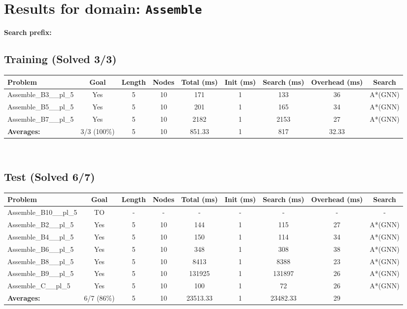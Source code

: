 \documentclass{article}
\begin{document}
\section*{Results for domain: \texttt{Assemble}}
\textbf{Search prefix:} 
\\[0.5cm]
\subsection*{Training (Solved 3/3)}
\begin{tabular}{lcccccccc}
\toprule
Problem & Goal & Length & Nodes & Total (ms) & Init (ms) & Search (ms) & Overhead (ms) & Search \\
\midrule
Assemble\_B3\_\_pl\_5 & Yes & 5 & 10 & 171 & 1 & 133 & 36 & A*(GNN) \\
Assemble\_B5\_\_pl\_5 & Yes & 5 & 10 & 201 & 1 & 165 & 34 & A*(GNN) \\
Assemble\_B7\_\_pl\_5 & Yes & 5 & 10 & 2182 & 1 & 2153 & 27 & A*(GNN) \\
\textbf{Averages:} & 3/3 (100\%) & 5 & 10 & 851.33 & 1 & 817 & 32.33 & \\
\bottomrule
\end{tabular}
\\[0.7cm]
\subsection*{Test (Solved 6/7)}
\begin{tabular}{lcccccccc}
\toprule
Problem & Goal & Length & Nodes & Total (ms) & Init (ms) & Search (ms) & Overhead (ms) & Search \\
\midrule
Assemble\_B10\_\_pl\_5 & TO & - & - & - & - & - & - & - \\
Assemble\_B2\_\_pl\_5 & Yes & 5 & 10 & 144 & 1 & 115 & 27 & A*(GNN) \\
Assemble\_B4\_\_pl\_5 & Yes & 5 & 10 & 150 & 1 & 114 & 34 & A*(GNN) \\
Assemble\_B6\_\_pl\_5 & Yes & 5 & 10 & 348 & 1 & 308 & 38 & A*(GNN) \\
Assemble\_B8\_\_pl\_5 & Yes & 5 & 10 & 8413 & 1 & 8388 & 23 & A*(GNN) \\
Assemble\_B9\_\_pl\_5 & Yes & 5 & 10 & 131925 & 1 & 131897 & 26 & A*(GNN) \\
Assemble\_C\_\_pl\_5 & Yes & 5 & 10 & 100 & 1 & 72 & 26 & A*(GNN) \\
\textbf{Averages:} & 6/7 (86\%) & 5 & 10 & 23513.33 & 1 & 23482.33 & 29 & \\
\bottomrule
\end{tabular}
\\[0.7cm]
\end{document}
